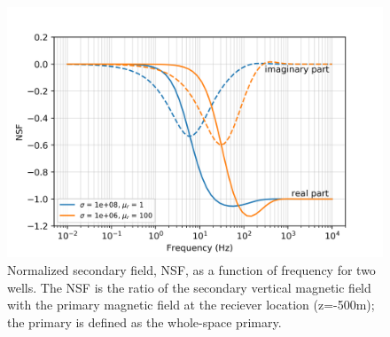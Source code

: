 \begin{figure}[htb]
    \begin{center}
    \includegraphics[width=0.6\columnwidth]{figures/fdemNSF.png}
    \end{center}
\caption{
    Normalized secondary field, NSF, as a function of frequency for two wells.
    The NSF is the ratio of the secondary vertical magnetic field with the primary magnetic field at the reciever location (z=-500m);
    the primary is defined as the whole-space primary.
}
\label{fig:fdemNSF}
\end{figure}

